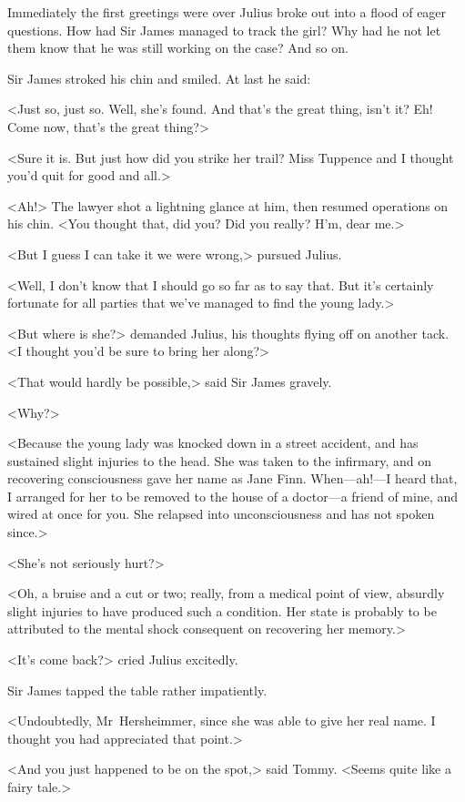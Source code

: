 Immediately the first greetings were over Julius broke out into a flood of eager questions. How had Sir James managed to track the girl? Why had he not let them know that he was still working on the case? And so on.

Sir James stroked his chin and smiled. At last he said:

<Just so, just so. Well, she's found. And that's the great thing, isn't it? Eh! Come now, that's the great thing?>

<Sure it is. But just how did you strike her trail? Miss Tuppence and I thought you'd quit for good and all.>

<Ah!> The lawyer shot a lightning glance at him, then resumed operations on his chin. <You thought that, did you? Did you really? H'm, dear me.>

<But I guess I can take it we were wrong,> pursued Julius.

<Well, I don't know that I should go so far as to say that. But it's certainly fortunate for all parties that we've managed to find the young lady.>

<But where is she?> demanded Julius, his thoughts flying off on another tack. <I thought you'd be sure to bring her along?>

<That would hardly be possible,> said Sir James gravely.

<Why?>

<Because the young lady was knocked down in a street accident, and has sustained slight injuries to the head. She was taken to the infirmary, and on recovering consciousness gave her name as Jane Finn. When—ah!—I heard that, I arranged for her to be removed to the house of a doctor—a friend of mine, and wired at once for you. She relapsed into unconsciousness and has not spoken since.>

<She's not seriously hurt?>

<Oh, a bruise and a cut or two; really, from a medical point of view, absurdly slight injuries to have produced such a condition. Her state is probably to be attributed to the mental shock consequent on recovering her memory.>

<It's come back?> cried Julius excitedly.

Sir James tapped the table rather impatiently.

<Undoubtedly, Mr~Hersheimmer, since she was able to give her real name. I thought you had appreciated that point.>

<And you just happened to be on the spot,> said Tommy. <Seems quite like a fairy tale.>

